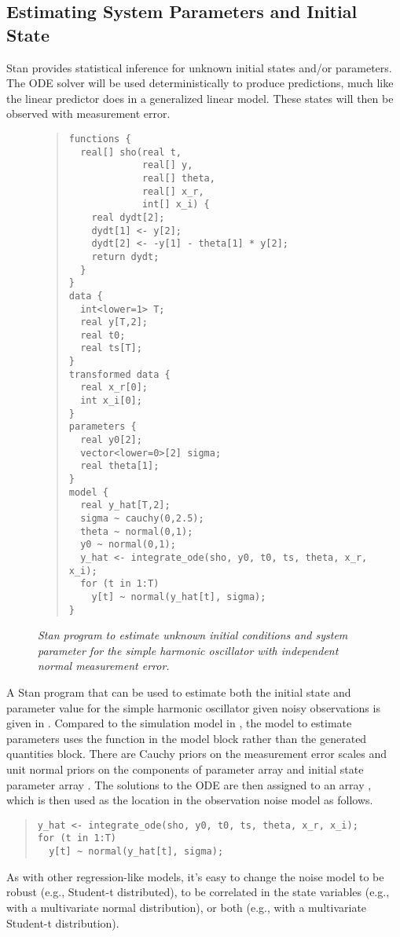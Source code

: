 \subsection{Estimating System Parameters and Initial State}

Stan provides statistical inference for unknown initial states and/or
parameters.  The ODE solver will be used deterministically to produce
predictions, much like the linear predictor does in a generalized
linear model.  These states will then be observed with measurement error.

%
\begin{figure}
\begin{quote}\small
\begin{Verbatim}
functions {
  real[] sho(real t,
             real[] y, 
             real[] theta,
             real[] x_r,
             int[] x_i) {
    real dydt[2];
    dydt[1] <- y[2];
    dydt[2] <- -y[1] - theta[1] * y[2];
    return dydt;
  }
}
data {
  int<lower=1> T;
  real y[T,2];
  real t0;
  real ts[T];
}
transformed data {
  real x_r[0];
  int x_i[0];
}
parameters {
  real y0[2];
  vector<lower=0>[2] sigma;
  real theta[1];
}
model {
  real y_hat[T,2];
  sigma ~ cauchy(0,2.5);
  theta ~ normal(0,1);
  y0 ~ normal(0,1);
  y_hat <- integrate_ode(sho, y0, t0, ts, theta, x_r, x_i);
  for (t in 1:T)
    y[t] ~ normal(y_hat[t], sigma);
}
\end{Verbatim}
\end{quote}
\vspace*{-0.2in}
\caption{\small\it Stan program to estimate unknown initial conditions
   and system parameter  for the simple harmonic
  oscillator with independent normal measurement
  error.}\label{sho-both.figure}
\end{figure}
%
A Stan program that can be used to estimate both the initial state and
parameter value for the simple harmonic oscillator given noisy
observations is given in .  Compared to the
simulation model in , the model to estimate
parameters uses the  function in the model block
rather than the generated quantities block.  There are Cauchy priors on the
measurement error scales  and unit normal priors on the
components of parameter array  and initial state parameter
array .  The solutions to the ODE are then assigned to an
array , which is then used as the location in the
observation noise model as follows.
%
\begin{quote}
\begin{Verbatim}
y_hat <- integrate_ode(sho, y0, t0, ts, theta, x_r, x_i);
for (t in 1:T)
  y[t] ~ normal(y_hat[t], sigma);
\end{Verbatim}
\end{quote}
%
As with other regression-like models, it's easy to change the noise
model to be robust (e.g., Student-t distributed), to be correlated in
the state variables (e.g., with a multivariate normal distribution),
or both (e.g., with a multivariate Student-t distribution).

